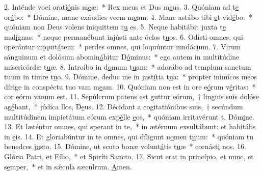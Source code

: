 2. Inténde voci orati\uline{ó}nis m\uline{e}æ:~* Rex meus et Dus m\uline{e}us.
3. Quóniam ad t\uline{e} or\uline{á}bo:~* Dómine, mane exáudies vcem m\uline{e}am.
4. Mane astábo tibi \uline{e}t vid\uline{é}bo:~* quóniam non Deus volens iniquittem t\uline{u} es.
5. Neque habitábit juxta t\uline{e} mal\uline{í}gnus:~* neque permanébunt injústi ante óclos t\uline{u}os.
6. Odísti omnes, qui operántur in\uline{i}quit\uline{á}tem:~* perdes omnes, qui loquúntur mndác\uline{i}um.
7. Virum sánguinum et dolósum abomin\uline{á}bitur D\uline{ó}minus:~* ego autem in multitúdine misericórdæ t\uline{u}æ.
8. Introíbo in d\uline{o}mum t\uline{u}am:~* adorábo ad templum sanctum tuum in timre t\uline{u}o.
9. Dómine, deduc me in just\uline{í}tia t\uline{u}a:~* propter inimícos meos dírige in conspéctu tuo vam m\uline{e}am.
10. Quóniam non est in ore e\uline{ó}rum v\uline{é}ritas:~* cor eórm van\uline{u}m est.
11. Sepúlcrum patens est guttur eórum,~† linguis suis dol\uline{ó}se ag\uline{é}bant,~* júdica llos, D\uline{e}us.
12. Décidant a cogitatiónibus suis,~† secúndum multitúdinem impietátum eórum exp\uline{é}lle \uline{e}os,~* quóniam irritavérunt t, Dóm\uline{i}ne.
13. Et læténtur omnes, qui sp\uline{e}rant \uline{i}n te,~* in ætérnum exsultábunt: et habitábs in \uline{e}is.
14. Et gloriabúntur in te omnes, qui díligunt n\uline{o}men t\uline{u}um:~* quóniam tu benedces j\uline{u}sto.
15. Dómine, ut scuto bonæ volunt\uline{á}tis t\uline{u}æ~* cornást\uline{i} nos.
16. Glória P\uline{a}tri, et F\uline{í}lio,~* et Spiríti S\uline{a}ncto.
17. Sicut erat in princípio, et n\uline{u}nc, et s\uline{e}mper,~* et in sǽcula sæculrum. \uline{A}men.
